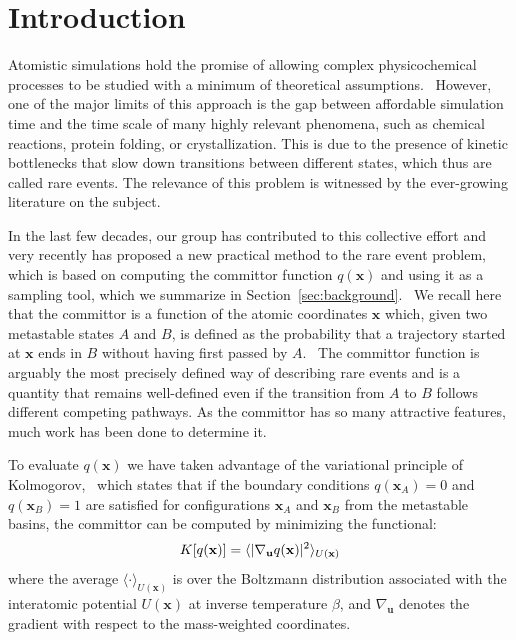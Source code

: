 \section{Introduction}
    Atomistic simulations hold the promise of allowing complex physicochemical processes to be studied with a minimum of theoretical assumptions.~\cite{frenkel2001understanding}   
    However, one of the major limits of this approach is the gap between affordable simulation time and the time scale of many highly relevant phenomena, such as chemical reactions, protein folding, or crystallization.  
    This is due to the presence of kinetic bottlenecks that slow down transitions between different states, which thus are called rare events. 
    The relevance of this problem is witnessed by the ever-growing literature on the subject.~\cite{Henin2022enhanced}
    
    In the last few decades, our group has contributed to this collective effort and very recently has proposed a new practical method to  the rare event problem, which is based on computing the committor function $q(\textbf{x})$ and using it as a sampling tool, which we summarize in Section~\ref{sec:background}.~\cite{kang2024computing}  
    We recall here that the committor is a function of the atomic coordinates $\textbf{x}$ which, given two metastable states $A$ and $B$, is defined as the probability that a trajectory started at $\textbf{x}$ ends in $B$ without having first passed by $A$.~\cite{weinan2010transition}    
    The committor function is arguably the most precisely defined way of describing rare events and is a quantity that remains well-defined even if the transition from  $A$ to $B$  follows different competing pathways. As the committor has so many attractive features, much work has been done to determine it.~\cite{bolhuis2000reaction,ma2005automatic,berezhkovskii2005one, peters2006obtaining,e2006towards,rotskoff2022active,chen2023committor,chen2023discovering,li2019computing,jung2023machine,mitchell2024committor,he2022committor,khoo2019solving}

    To evaluate $q(\textbf{x})$  we have taken advantage of the variational principle of Kolmogorov,~\cite{kolmogoroff1931analytischen} which states that if the boundary conditions $q({\textbf{x}}_A)=0$ and $q({\textbf{x}}_B)=1$ are satisfied for configurations $\textbf{x}_A$ and $\textbf{x}_B$ from the metastable basins, the committor can be computed by minimizing the functional:
        \begin{equation}
          K[q(\textbf{x})] = \langle |\nabla_\textbf {u} q(\textbf x)|^2 \rangle _{U(\textbf{x})}  
        \end{equation}
    where the average $\langle \cdot \rangle_{U(\textbf{x})}$ is over the Boltzmann distribution associated with the interatomic potential $U(\textbf{x})$ at inverse temperature $\beta$, and $\nabla_\textbf{u}$ denotes the gradient with respect to the mass-weighted coordinates.
    
